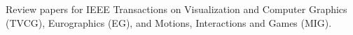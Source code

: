 \documentclass[10pt]{article} %
\begin{document}
{
Review papers for IEEE Transactions on Visualization and Computer Graphics (TVCG), Eurographics (EG), and Motions, Interactions and Games (MIG).\\
}






\end{document}
